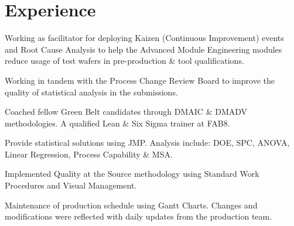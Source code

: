 \documentclass[]{bigfatnoob-resume}
\begin{document}
\hfill
\begin{minipage}[t]{0.66\textwidth} 


\section{Experience}

\vspace{\topsep} %
\begin{tightemize}
\item Working as facilitator for deploying {\ibf Kaizen} (Continuous Improvement) events and {\ibf R}oot {\ibf C}ause {\ibf A}nalysis to help the {\ibf A}dvanced {\ibf M}odule {\ibf E}ngineering modules reduce usage of test wafers in pre-production \& tool qualifications.
\item Working in tandem with the {\ibf Process Change Review Board} to improve the quality of statistical analysis in the submissions.
\item Coached fellow Green Belt candidates through {\ibf DMAIC} \& {\ibf DMADV} methodologies. A qualified {\ibf Lean} \& {\ibf Six Sigma} trainer at {\ibf FAB8}.
\item Provide statistical solutions using {\ibf JMP}. Analysis  include:  DOE, SPC, ANOVA, Linear Regression, Process Capability \& MSA.
\end{tightemize}
\sectionsep

\begin{tightemize}
\item Implemented {\ibf Quality at the Source} methodology using Standard Work Procedures and Visual Management.
\item Maintenance of production schedule using {\ibf Gantt Charts}. Changes and modifications were reflected with daily updates from the production team.
\end{tightemize}
\sectionsep



\end{minipage}
\end{document}
